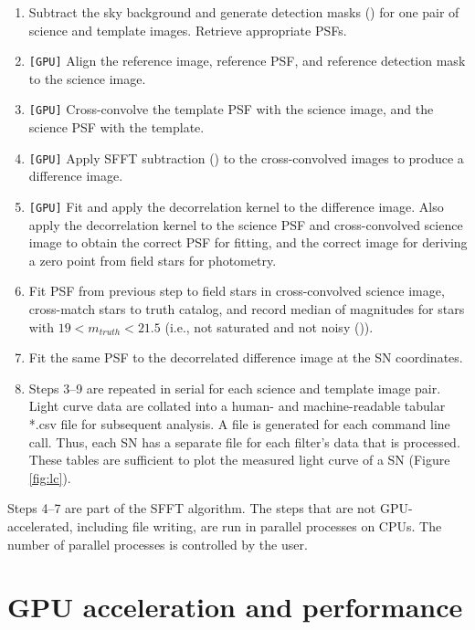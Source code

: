 \documentclass[10pt,a4paper,onecolumn]{article}
\providecommand{\tightlist}{%
  \setlength{\itemsep}{0pt}\setlength{\parskip}{0pt}}
\begin{document}
\begin{enumerate}
\def\labelenumi{\arabic{enumi}.}
\setcounter{enumi}{2}
\tightlist
\item
  Subtract the sky background and generate detection masks
  () for one pair
  of science and template images. Retrieve appropriate PSFs.
\item
  \texttt{{[}GPU{]}} Align the reference image, reference PSF, and
  reference detection mask to the science image.
\item
  \texttt{{[}GPU{]}} Cross-convolve the template PSF with the science
  image, and the science PSF with the template.
\item
  \texttt{{[}GPU{]}} Apply SFFT subtraction () to the cross-convolved images to produce a difference
  image.
\item
  \texttt{{[}GPU{]}} Fit and apply the decorrelation kernel to the
  difference image. Also apply the decorrelation kernel to the science
  PSF and cross-convolved science image to obtain the correct PSF for
  fitting, and the correct image for deriving a zero point from field
  stars for photometry.
\item
  Fit PSF from previous step to field stars in cross-convolved science
  image, cross-match stars to truth catalog, and record median of
  magnitudes for stars with \(19 < m_{truth} < 21.5\) (i.e., not
  saturated and not noisy ()).
\item
  Fit the same PSF to the decorrelated difference image at the SN
  coordinates.
\item
  Steps 3--9 are repeated in serial for each science and template image
  pair. Light curve data are collated into a human- and machine-readable
  tabular *.csv file for subsequent analysis. A file is generated for
  each command line call. Thus, each SN has a separate file for each
  filter's data that is processed. These tables are sufficient to plot
  the measured light curve of a SN (Figure \ref{fig:lc}).
\end{enumerate}

Steps 4--7 are part of the SFFT algorithm. The steps that are not
GPU-accelerated, including file writing, are run in parallel processes
on CPUs. The number of parallel processes is controlled by the user.

\section{GPU acceleration and
performance}\label{gpu-acceleration-and-performance}
\end{document}
